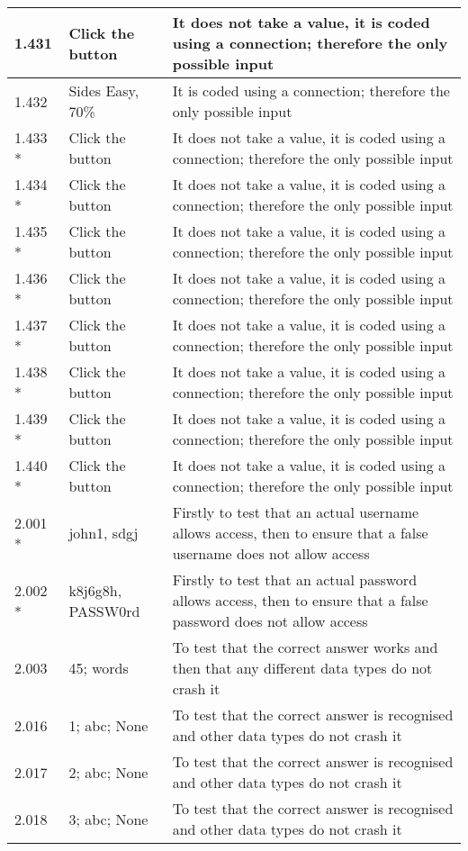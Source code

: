 \begin{landscape}
\begin{center}
\begin{longtable}{|p{4cm}|p{4cm}|p{5cm}|}
1.431 & Click the button & It does not take a value, it is coded using a connection; therefore the only possible input \\ \hline
1.432 & Sides Easy, 70\% & It is coded using a connection; therefore the only possible input \\ \hline
1.433 * & Click the button & It does not take a value, it is coded using a connection; therefore the only possible input \\ \hline
1.434 * & Click the button & It does not take a value, it is coded using a connection; therefore the only possible input \\ \hline
1.435 * & Click the button & It does not take a value, it is coded using a connection; therefore the only possible input \\ \hline
1.436 * & Click the button & It does not take a value, it is coded using a connection; therefore the only possible input \\ \hline
1.437 * & Click the button & It does not take a value, it is coded using a connection; therefore the only possible input \\ \hline
1.438 * & Click the button & It does not take a value, it is coded using a connection; therefore the only possible input \\ \hline
1.439 * & Click the button & It does not take a value, it is coded using a connection; therefore the only possible input \\ \hline
1.440 * & Click the button & It does not take a value, it is coded using a connection; therefore the only possible input \\ \hline
2.001 * & john1, sdgj & Firstly to test that an actual username allows access, then to ensure that a false username does not allow access \\ \hline
2.002 * & k8j6g8h, PASSW0rd & Firstly to test that an actual password allows access, then to ensure that a false password does not allow access \\ \hline
2.003 & 45; words & To test that the correct answer works and then that any different data types do not crash it \\ \hline
2.016 & 1; abc; None & To test that the correct answer is recognised and other data types do not crash it \\ \hline
2.017 & 2; abc; None & To test that the correct answer is recognised and other data types do not crash it \\ \hline 
2.018 & 3; abc; None & To test that the correct answer is recognised and other data types do not crash it \\ \hline

\end{longtable}
\end{center}
\end{landscape}
